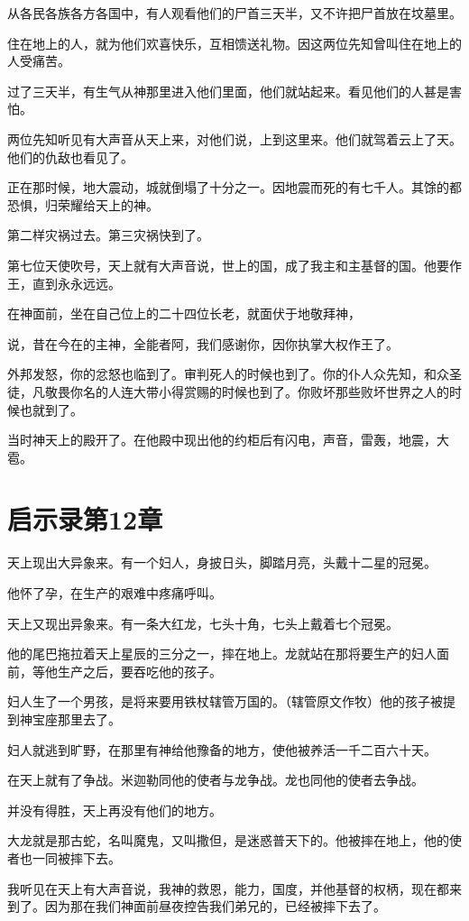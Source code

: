 \documentclass[12pt,oneside]{book}
\begin{document}
从各民各族各方各国中，有人观看他们的尸首三天半，又不许把尸首放在坟墓里。

住在地上的人，就为他们欢喜快乐，互相馈送礼物。因这两位先知曾叫住在地上的人受痛苦。

过了三天半，有生气从神那里进入他们里面，他们就站起来。看见他们的人甚是害怕。

两位先知听见有大声音从天上来，对他们说，上到这里来。他们就驾着云上了天。他们的仇敌也看见了。

正在那时候，地大震动，城就倒塌了十分之一。因地震而死的有七千人。其馀的都恐惧，归荣耀给天上的神。

第二样灾祸过去。第三灾祸快到了。

第七位天使吹号，天上就有大声音说，世上的国，成了我主和主基督的国。他要作王，直到永永远远。

在神面前，坐在自己位上的二十四位长老，就面伏于地敬拜神，

说，昔在今在的主神，全能者阿，我们感谢你，因你执掌大权作王了。

外邦发怒，你的忿怒也临到了。审判死人的时候也到了。你的仆人众先知，和众圣徒，凡敬畏你名的人连大带小得赏赐的时候也到了。你败坏那些败坏世界之人的时候也就到了。

当时神天上的殿开了。在他殿中现出他的约柜后有闪电，声音，雷轰，地震，大雹。

\chapter{启示录第12章}
天上现出大异象来。有一个妇人，身披日头，脚踏月亮，头戴十二星的冠冕。

他怀了孕，在生产的艰难中疼痛呼叫。

天上又现出异象来。有一条大红龙，七头十角，七头上戴着七个冠冕。

他的尾巴拖拉着天上星辰的三分之一，摔在地上。龙就站在那将要生产的妇人面前，等他生产之后，要吞吃他的孩子。

妇人生了一个男孩，是将来要用铁杖辖管万国的。（辖管原文作牧）他的孩子被提到神宝座那里去了。

妇人就逃到旷野，在那里有神给他豫备的地方，使他被养活一千二百六十天。

在天上就有了争战。米迦勒同他的使者与龙争战。龙也同他的使者去争战。

并没有得胜，天上再没有他们的地方。

大龙就是那古蛇，名叫魔鬼，又叫撒但，是迷惑普天下的。他被摔在地上，他的使者也一同被摔下去。

我听见在天上有大声音说，我神的救恩，能力，国度，并他基督的权柄，现在都来到了。因为那在我们神面前昼夜控告我们弟兄的，已经被摔下去了。
\end{document}
